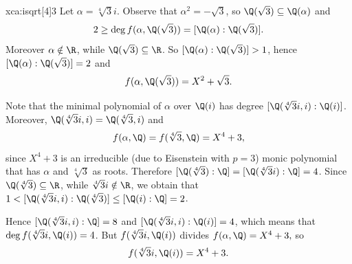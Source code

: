 \begin{sol}{xca:isqrt[4]3}
Let $\alpha=\sqrt[4]{3}i$. Observe that $\alpha^2 = -\sqrt{3}$,
so $\Q(\sqrt{3})\subseteq \Q(\alpha)$ and 
\[
2\geq \deg f(\alpha,\Q(\sqrt{3}))=[\Q(\alpha):\Q(\sqrt{3})].
\]
Moreover $\alpha\notin\R$,
while $\Q(\sqrt{3})\subseteq \R$.
So $[\Q(\alpha):\Q(\sqrt{3})]>1$, 
hence $[\Q(\alpha):\Q(\sqrt{3})]=2$ and 
$$f(\alpha,\Q(\sqrt{3}))=X^2+\sqrt{3}.$$

Note that the minimal polynomial of $\alpha$
over $\Q(i)$ has degree $[\Q(\sqrt[4]{3}i,i):\Q(i)]$.
Moreover, $\Q(\sqrt[4]{3}i,i)=\Q(\sqrt[4]{3},i)$ and
$$f(\alpha,\Q)=f(\sqrt[4]{3},\Q)=X^4+3,$$
since $X^4+3$ is an irreducible
(due to Eisenstein with $p=3$)
monic polynomial that has $\alpha$ and $\sqrt[4]{3}$
as roots.
Therefore $[\Q(\sqrt[4]{3}):\Q]=[\Q(\sqrt[4]{3}i):\Q]=4$.
Since $\Q(\sqrt[4]{3})\subseteq\R$, while $\sqrt[4]{3}i\notin\R$,
we obtain that $1<[\Q(\sqrt[4]{3}i,i):\Q(\sqrt[4]{3})]\leq [\Q(i):\Q]=2$.
\begin{center}
    \end{center}
Hence $[\Q(\sqrt[4]{3}i,i):\Q]=8$ and $[\Q(\sqrt[4]{3}i,i):\Q(i)]=4$, which means that $\deg f(\sqrt[4]{3}i,\Q(i))=4$.
But $f(\sqrt[4]{3}i,\Q(i))$ divides $f(\alpha,\Q)=X^4+3,$ so
$$f(\sqrt[4]{3}i,\Q(i))=X^4+3.$$
\end{sol}

